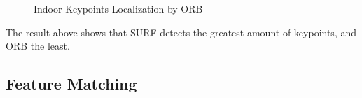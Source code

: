 \documentclass[paper=a4, fontsize=11pt]{scrartcl} %
\numberwithin{equation}{section} %
\numberwithin{figure}{section} %
\numberwithin{table}{section} %
\begin{document}
\begin{figure}[H]
\centering
{}
\hspace{1in}
\caption{Indoor Keypoints Localization by ORB}
\label{fig:indoor1-orb} %
\end{figure} 

The result above shows that SURF detects the greatest amount of keypoints, and ORB the least.


 

 

 


\subsection{Feature Matching}
\end{document}
